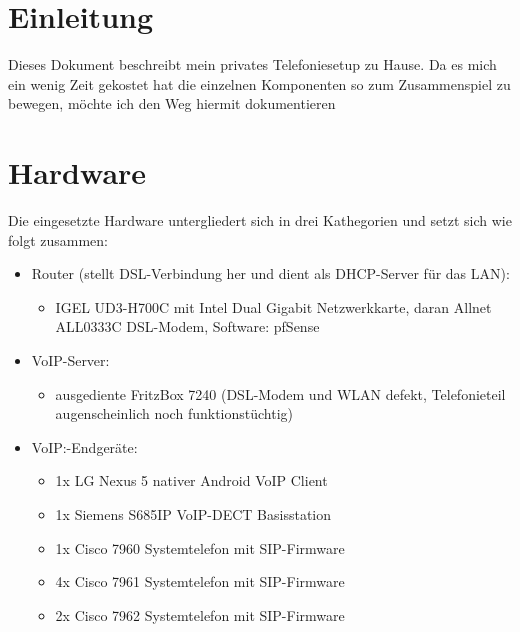 \documentclass[a4paper,12pt]{scrbook}
\begin{document}


\pagestyle{fancy} 
\fancyhf{}  %
\renewcommand{\headrulewidth}{1pt} 
\fancyhead[EL]{\nouppercase{\leftmark}} %
\fancyhead[OR]{\nouppercase{\leftmark}} %
\fancyfoot[EL]{\thepage} %
\fancyfoot[OR]{\thepage} %



\clearpage
\chapter{Einleitung}
\label{sec:0}
Dieses Dokument beschreibt mein privates Telefoniesetup zu Hause. Da es mich ein wenig Zeit gekostet hat die einzelnen Komponenten
so zum Zusammenspiel zu bewegen, möchte ich den Weg hiermit dokumentieren

\chapter{Hardware}
\label{sec:1}

Die eingesetzte Hardware untergliedert sich in drei Kathegorien und setzt sich wie folgt zusammen:

\begin{itemize}
 \item Router (stellt DSL-Verbindung her und dient als DHCP-Server für das LAN):
 \begin{itemize}
  \item IGEL UD3-H700C mit Intel Dual Gigabit Netzwerkkarte, daran Allnet ALL0333C DSL-Modem, Software: pfSense
 \end{itemize}
 \item VoIP-Server: 
 \begin{itemize}
  \item ausgediente FritzBox 7240 (DSL-Modem und WLAN defekt, Telefonieteil augenscheinlich noch funktionstüchtig)
 \end{itemize}
 \item VoIP:-Endgeräte:
 \begin{itemize}
  \item 1x LG Nexus 5 nativer Android VoIP Client
  \item 1x Siemens S685IP VoIP-DECT Basisstation
  \item 1x Cisco 7960 Systemtelefon mit SIP-Firmware
  \item 4x Cisco 7961 Systemtelefon mit SIP-Firmware
  \item 2x Cisco 7962 Systemtelefon mit SIP-Firmware
 \end{itemize}
\end{itemize}
\end{document}
